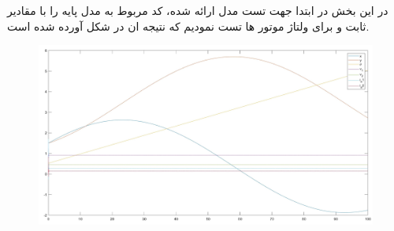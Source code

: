 در این بخش در ابتدا جهت تست مدل ارائه شده، کد مربوط به مدل پایه را با مقادیر ثابت  و  برای ولتاژ موتور ها تست نمودیم که نتیجه ان در شکل  آورده شده است.

\begin{figure}[h]
	\centering
	\includegraphics[width=15cm]{img/test1.jpg}
\end{figure}


